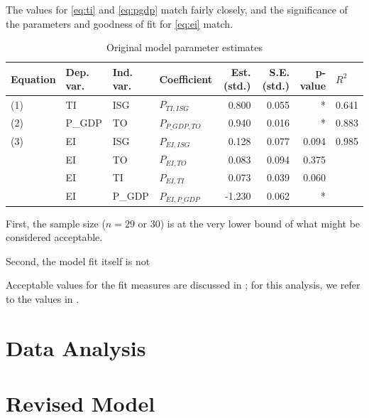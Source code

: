 \documentclass[11pt,a4paper]{article}
\begin{document}
The values for \cref{eq:ti} and \cref{eq:pgdp} match fairly closely, and the significance of the parameters and goodness of fit for \cref{eq:ei} match.

\begin{table}[tbp]
\centering
\begin{tabular}{llllrrrl}
\toprule
Equation & Dep. var. & Ind. var. &      Coefficient &  Est. (std.) &  S.E. (std.) & p-value & $R^{2}$ \\
\midrule
    (1) &        TI &       ISG &     $P_{TI,ISG}$ &        0.800 &        0.055 &       * &   0.641 \\
    (2) &    P\_GDP &        TO &  $P_{P\_GDP,TO}$ &        0.940 &        0.016 &       * &   0.883 \\
    (3) &        EI &       ISG &     $P_{EI,ISG}$ &        0.128 &        0.077 &   0.094 &   0.985 \\
        &        EI &        TO &      $P_{EI,TO}$ &        0.083 &        0.094 &   0.375 &         \\
        &        EI &        TI &      $P_{EI,TI}$ &        0.073 &        0.039 &   0.060 &         \\
        &        EI &    P\_GDP &  $P_{EI,P\_GDP}$ &       -1.230 &        0.062 &       * &         \\
\bottomrule
\end{tabular}
\caption{Original model parameter estimates}
\label{tab:original_estimates}
\end{table}






First, the sample size ($n=29$ or 30) is at the very lower bound of what might be considered acceptable.

Second, the model fit itself is not

Acceptable values for the fit measures are discussed in \cite{klinePrinciplesPracticeStructural2016}; for this analysis, we refer to the values in \cite{parryFitIndicesCommonly2020}.



\section{Data Analysis}\label{sec:data_analysis}

\section{Revised Model}\label{sec:revised_model}
\end{document}
